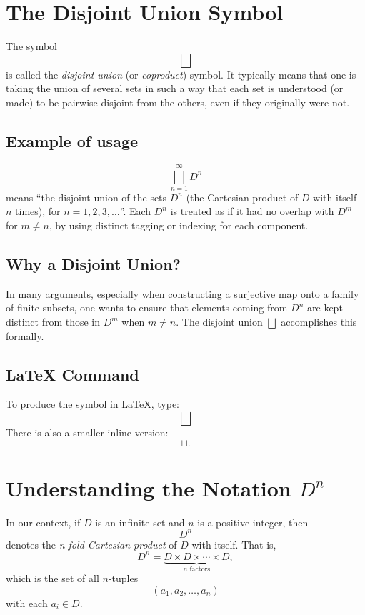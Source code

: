 \documentclass[12pt]{article}
\theoremstyle{definition} %
\theoremstyle{plain} %
\begin{document}
\section*{The Disjoint Union Symbol}

The symbol 
\[
   \bigsqcup
\]
is called the \emph{disjoint union} (or \emph{coproduct}) symbol. It typically means that one is taking the union of several sets in such a way that each set is understood (or made) to be pairwise disjoint from the others, even if they originally were not.

\subsection*{Example of usage}
\[
  \bigsqcup_{n=1}^{\infty} D^{n}
\]
means ``the disjoint union of the sets $D^{n}$ (the Cartesian product of $D$ with itself $n$ times), for $n=1,2,3,\dots$''. Each $D^{n}$ is treated as if it had no overlap with $D^{m}$ for $m\neq n$, by using distinct tagging or indexing for each component.

\subsection*{Why a Disjoint Union?}
In many arguments, especially when constructing a surjective map onto a family of finite subsets, one wants to ensure that elements coming from $D^n$ are kept distinct from those in $D^m$ when $m\ne n$. The disjoint union $\bigsqcup$ accomplishes this formally.

\subsection*{LaTeX Command}
To produce the symbol in LaTeX, type:
\[
  \bigsqcup
\]
There is also a smaller inline version: 
\[
  \sqcup.
\]
\section*{Understanding the Notation \texorpdfstring{$D^n$}{D^n}}

In our context, if \(D\) is an infinite set and \(n\) is a positive integer, then 
\[
    D^n
\]
denotes the \emph{n‑fold Cartesian product} of \(D\) with itself.  
That is,
\[
    D^n = \underbrace{D \times D \times \cdots \times D}_{n\text{ factors}},
\]
which is the set of all \(n\)-tuples
\[
    (a_{1}, a_{2}, \dots, a_{n})
\]
with each \(a_{i}\in D\).

\bigskip
\end{document}

